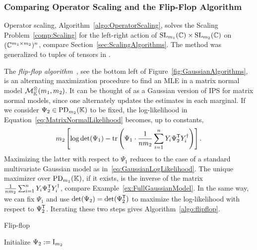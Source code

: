 \subsubsection*{Comparing Operator Scaling and the Flip-Flop Algorithm}
Operator scaling, Algorithm~\ref{algo:OperatorScaling}, solves the Scaling Problem~\ref{comp:Scaling} for the left-right action of $\operatorname{SL}_{m_1}(\mathbb C) \times \operatorname{SL}_{m_2}(\mathbb C)$ on $(\mathbb C^{m_1 \times m_2})^n$, compare Section~\ref{sec:ScalingAlgorithms}.
The method was generalized to tuples of tensors in \cite[Algorithm~1]{burgisser2017alternating}. 

The \emph{flip-flop algorithm}~\cite{dutilleul1999mle,lu2005likelihood, werner2008onEstimation}, see the bottom left of Figure~\ref{fig:GaussianAlgorithms}, is an alternating maximization procedure to find an MLE in a matrix normal model $\mathcal{M}^{\otimes}_{\mathbb{K}}(m_1,m_2)$.
It can be thought of as a Gaussian version of IPS for matrix normal models, since one alternately updates the estimates in each marginal.
If we consider $\Psi_2 \in \operatorname{PD}_{m_2}(\mathbb K)$ to be fixed, the log-likelihood in Equation~\eqref{eq:MatrixNormalLikelihood} becomes, up to constants,
\begin{equation*}
	m_2 \left[ \log \det(\Psi_1) - \operatorname{tr} \left( 
	\Psi_1 \cdot \frac{1}{nm_2} \sum_{i=1}^n Y_i \Psi_2^{\mathsf{T}} Y_i^{\dagger} \right) \right].
\end{equation*}
Maximizing the latter with respect to $\Psi_1$ reduces to the case of a standard multivariate Gaussian model as in~\eqref{eq:GaussianLogLikelihood}.
The unique maximizer over $\operatorname{PD}_{m_1}(\mathbb K)$, if it exists, is the inverse of the matrix $\frac{1}{nm_2} \sum_{i=1}^n Y_i \Psi_2^{\mathsf{T}} Y_i^{\dagger}$, compare Example~\ref{ex:FullGaussianModel}.
In the same way, we can fix $\Psi_1$ and use $\det(\Psi_2) = \det(\Psi_2^{\mathsf{T}})$ to maximize the log-likelihood with respect to $\Psi_2^{\mathsf{T}}$. Iterating these two steps gives Algorithm~\ref{algo:flipflop}.

\begin{algorithm}
	\caption{Flip-flop {\cite[Algorithm~4.1]{SiagaPaper}}} \label{algo:flipflop}
		\SetAlgoLined
		\BlankLine
		Initialize $\Psi_2 := \operatorname{I}_{m_2}$\;
\end{algorithm}

